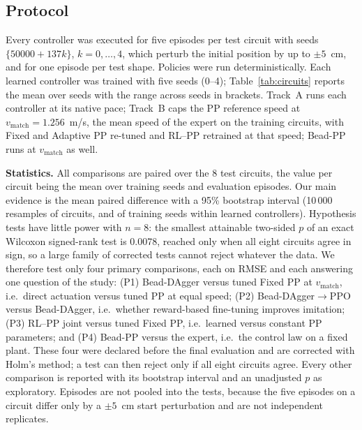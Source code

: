 \documentclass[conference]{IEEEtran}
\begin{document}
\subsection{Protocol}
Every controller was executed for five episodes per test circuit with seeds $\{50000+137k\}$, $k=0,\dots,4$, which perturb the initial position by up to $\pm5$~cm, and for one episode per test shape. Policies were run deterministically. Each learned controller was trained with five seeds (0--4); Table~\ref{tab:circuits} reports the mean over seeds with the range across seeds in brackets. Track~A runs each controller at its native pace; Track~B caps the PP reference speed at $v_{\mathrm{match}}=1.256$~m/s, the mean speed of the expert on the training circuits, with Fixed and Adaptive PP re-tuned and RL--PP retrained at that speed; Bead-PP runs at $v_{\mathrm{match}}$ as well.

\textbf{Statistics.} All comparisons are paired over the 8 test circuits, the value per circuit being the mean over training seeds and evaluation episodes. Our main evidence is the mean paired difference with a 95\% bootstrap interval (10\,000 resamples of circuits, and of training seeds within learned controllers). Hypothesis tests have little power with $n=8$: the smallest attainable two-sided $p$ of an exact Wilcoxon signed-rank test is 0.0078, reached only when all eight circuits agree in sign, so a large family of corrected tests cannot reject whatever the data. We therefore test only four primary comparisons, each on RMSE and each answering one question of the study: (P1) Bead-DAgger versus tuned Fixed PP at $v_{\mathrm{match}}$, i.e.\ direct actuation versus tuned PP at equal speed; (P2) Bead-DAgger$\to$PPO versus Bead-DAgger, i.e.\ whether reward-based fine-tuning improves imitation; (P3) RL--PP joint versus tuned Fixed PP, i.e.\ learned versus constant PP parameters; and (P4) Bead-PP versus the expert, i.e.\ the control law on a fixed plant. These four were declared before the final evaluation and are corrected with Holm's method; a test can then reject only if all eight circuits agree. Every other comparison is reported with its bootstrap interval and an unadjusted $p$ as exploratory. Episodes are not pooled into the tests, because the five episodes on a circuit differ only by a $\pm5$~cm start perturbation and are not independent replicates.
\end{document}
